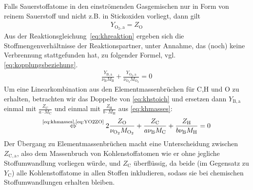 Falls Sauerstoffatome in den einströmenden Gasgemischen nur in Form von reinem Sauerstoff und nicht z.B. in Stickoxiden vorliegt, dann gilt
\begin{align}
    \label{eq:YO2ZO}
    Y_{\mathrm{O}_2,\text{a}} = Z_\mathrm{O}
\end{align}
Aus der Reaktionsgleichung~\ref{eq:khreaktion} ergeben sich die Stoffmengenverhältnisse der Reaktionspartner, unter Annahme, das (noch) keine Verbrennung stattgefunden hat, zu folgender Formel, vgl. \autoref{eq:kopplungsbeziehung}.
\begin{align}
    \label{eq:khstoich}
    \frac{ Y_{\mathrm{B}  ,\mathrm{a}} }{ \nu_{\mathrm{B}}   M_{\mathrm{B}}   } +
    \frac{ Y_{\mathrm{O}_2,\mathrm{a}} }{ \nu_{\mathrm{O}_2} M_{\mathrm{O}_2} } = 0
\end{align}
Um eine Linearkombination aus den Elementmassenbrüchen für C,H und O zu erhalten, betrachten wir das Doppelte von \autoref{eq:khstoich} und ersetzen dann $Y_{\mathrm{B},\text{a}}$ einmal mit $\frac{ Z_{\mathrm{C}} }{ a\cdot M_\mathrm{C} }$ und einmal mit $\frac{ Z_{\mathrm{H}} }{ b\cdot M_\mathrm{H} }$ aus \autoref{eq:khmasses}:
\begin{align}
    \overset{ \text{\autoref{eq:khmasses},\ref{eq:YO2ZO}} }{\Leftrightarrow}
    \label{eq:khstoich2}
    2 \frac{ Z_\mathrm{O} }{ \nu_{\mathrm{O}_2} M_{\mathrm{O}_2} }
    + \frac{ Z_\mathrm{C} }{ a \nu_\mathrm{B} M_\mathrm{C} }
    + \frac{ Z_\mathrm{H} }{ b \nu_\mathrm{B} M_\mathrm{H} } = 0
\end{align}
Der Übergang zu Elementmassenbrüchen macht eine Unterscheidung zwischen $Z_{\mathrm{C},\text{a}}$, also dem Massenbruch von Kohlenstoffatomen wie er ohne jegliche Stoffumwandlung vorliegen würde, und $Z_{\mathrm{C}}$ überflüssig, da beide (im Gegensatz zu $Y_\mathrm{C}$) alle Kohlenstoffatome in allen Stoffen inkludieren, sodass sie bei chemischen Stoffumwandlungen erhalten bleiben.\\

